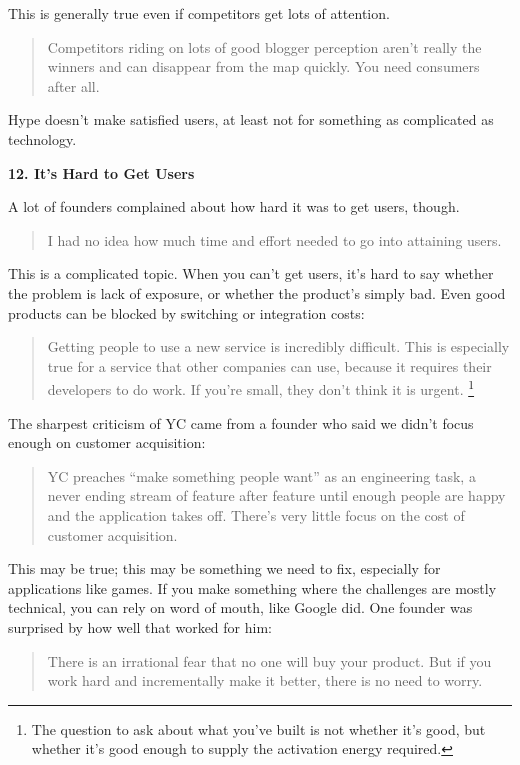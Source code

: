 This is generally true even if competitors get lots of attention.

\begin{quote}
Competitors riding on lots of good blogger perception aren't really the
winners and can disappear from the map quickly. You need consumers after
all.
\end{quote}

Hype doesn't make satisfied users, at least not for something as
complicated as technology.

\textbf{12. It's Hard to Get Users}

A lot of founders complained about how hard it was to get users, though.

\begin{quote}
I had no idea how much time and effort needed to go into attaining
users.
\end{quote}

This is a complicated topic. When you can't get users, it's hard to say
whether the problem is lack of exposure, or whether the product's simply
bad. Even good products can be blocked by switching or integration
costs:

\begin{quote}
Getting people to use a new service is incredibly difficult. This is
especially true for a service that other companies can use, because it
requires their developers to do work. If you're small, they don't think
it is urgent. \footnote{The question to ask about what you've built is not whether it's
good, but whether it's good enough to supply the activation energy
required.}
\end{quote}

The sharpest criticism of YC came from a founder who said we didn't
focus enough on customer acquisition:

\begin{quote}
YC preaches ``make something people want'' as an engineering task, a
never ending stream of feature after feature until enough people are
happy and the application takes off. There's very little focus on the
cost of customer acquisition.
\end{quote}

This may be true; this may be something we need to fix, especially for
applications like games. If you make something where the challenges are
mostly technical, you can rely on word of mouth, like Google did. One
founder was surprised by how well that worked for him:

\begin{quote}
There is an irrational fear that no one will buy your product. But if
you work hard and incrementally make it better, there is no need to
worry.
\end{quote}

